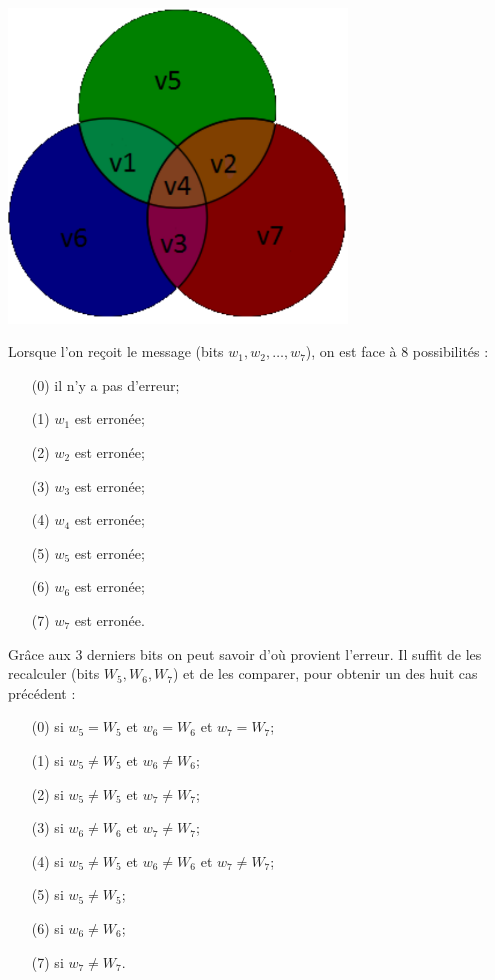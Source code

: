 \documentclass[12pt]{article}
\begin{document}
\linebreak
\\
\includegraphics[width=9cm]{cercles.PNG}


Lorsque l'on reçoit le message (bits $w_1, w_2, \ldots, w_7$), on est face à 8 possibilités :

\begin{enumerate}
  \item[(0)] il n'y a pas d'erreur;
  \item[(1)] $w_1$ est erronée;
  \item[(2)] $w_2$ est erronée;
  \item[(3)] $w_3$ est erronée;
  \item[(4)] $w_4$ est erronée;
  \item[(5)] $w_5$ est erronée;
  \item[(6)] $w_6$ est erronée;
  \item[(7)] $w_7$ est erronée.
\end{enumerate}

Grâce aux 3 derniers bits on peut savoir d'où provient l'erreur. Il suffit de les recalculer (bits $W_5, W_6, W_7$) et de les comparer, pour obtenir un des huit cas précédent :

\begin{enumerate}
  \item[(0)] si $w_5 = W_5$ et $w_6 = W_6$ et $w_7 = W_7$;
  \item[(1)] si $w_5 \ne W_5$ et $w_6 \ne W_6$;
  \item[(2)] si $w_5 \ne W_5$ et $w_7 \ne W_7$;
  \item[(3)] si $w_6 \ne W_6$ et $w_7 \ne W_7$;
  \item[(4)] si $w_5 \ne W_5$ et $w_6 \ne W_6$ et $w_7 \ne W_7$;
  \item[(5)] si $w_5 \ne W_5$;
  \item[(6)] si $w_6 \ne W_6$;
  \item[(7)] si $w_7 \ne W_7$.
\end{enumerate}
\end{document}
